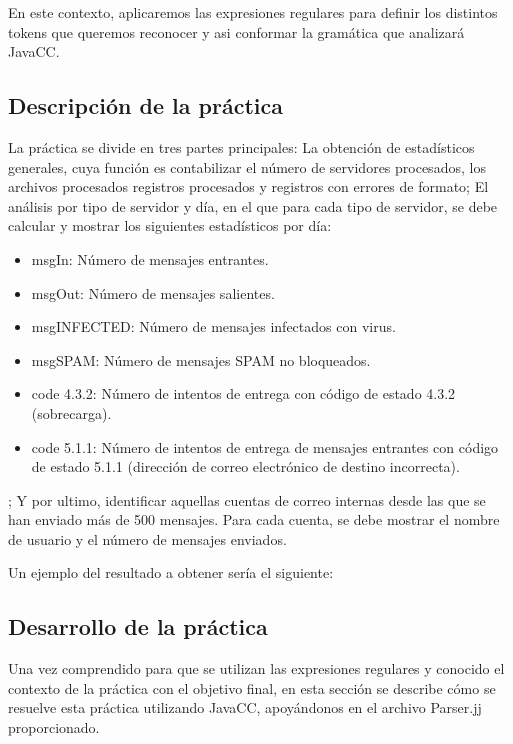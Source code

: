 En este contexto, aplicaremos las expresiones regulares para definir los distintos tokens que queremos reconocer y asi conformar la gramática que analizará JavaCC.

\subsection{Descripción de la práctica}

\noindent La práctica se divide en tres partes principales: La obtención de estadísticos generales, cuya función es contabilizar el número de servidores procesados, los  archivos procesados registros procesados y registros con errores de formato; El análisis por tipo de servidor y día, en el que para cada tipo de servidor, se debe calcular y mostrar los siguientes estadísticos por día:

\begin{itemize}
    \item msgIn: Número de mensajes entrantes.
    \item msgOut: Número de mensajes salientes.
    \item msgINFECTED: Número de mensajes infectados con virus.
    \item msgSPAM: Número de mensajes SPAM no bloqueados.
    \item code 4.3.2: Número de intentos de entrega con código de estado 4.3.2 (sobrecarga).
    \item code 5.1.1: Número de intentos de entrega de mensajes  entrantes con código de estado 5.1.1 (dirección de correo electrónico de destino incorrecta).
\end{itemize}

; Y por ultimo, identificar aquellas cuentas de correo internas desde las que se han enviado más de 500 mensajes. Para cada cuenta, se debe mostrar el nombre de usuario y el número de mensajes enviados.

Un ejemplo del resultado a obtener sería el siguiente:

\lstset{inputencoding=utf8/latin1}


\subsection{Desarrollo de la práctica}

Una vez comprendido para que se utilizan las expresiones regulares y conocido el contexto de la práctica con el objetivo final, en esta sección se describe cómo se resuelve esta práctica utilizando JavaCC, apoyándonos en el archivo Parser.jj proporcionado.

